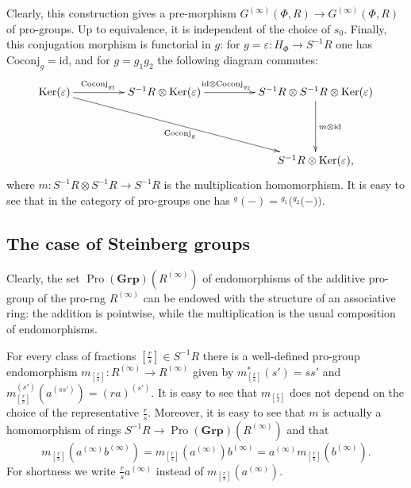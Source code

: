 \documentclass[oneside, 11pt]{amsart}
\numberwithin{equation}{section}
\theoremstyle{definition}
\theoremstyle{remark}
\DeclareMathOperator\Ker{Ker}
\DeclareMathOperator{\Pro}{Pro}
\newcommand{\Group}{\mathbf{Grp}}
\newcommand{\up}[2]{{^{#1}\!{#2}}}
\begin{document}
Clearly, this construction gives a pre-morphism \(G^{(\infty)}(\Phi, R) \to G^{(\infty)}(\Phi, R)\) of pro-groups. Up to equivalence, it is independent of the choice of \(s_0\). Finally, this conjugation morphism is functorial in \(g\): for \(g = \varepsilon \colon H_\Phi \to S^{-1} R\) one has \(\mathrm{Coconj}_g = \mathrm{id}\), and for \(g = g_1 g_2\) the following diagram commutes:
\[\xymatrix@+1.8pc{
\Ker(\varepsilon) \ar[r]^(.4){\mathrm{Coconj}_{g_{\scaleto{1}{2.5pt}}}} \ar[rrd]_{\mathrm{Coconj}_g} &
S^{-1} R \otimes \Ker(\varepsilon) \ar[r]^(0.41){\mathrm{id} \otimes \mathrm{Coconj}_{g_{\scaleto{2}{2.5pt}}}} &
S^{-1}R \otimes S^{-1} R \otimes \Ker(\varepsilon) \ar[d]^(0.5){m \otimes \mathrm{id}} \\
& & S^{-1} R \otimes \Ker(\varepsilon),
}\]
where \(m \colon S^{-1} R \otimes S^{-1} R \to S^{-1} R\) is the multiplication homomorphism. It is easy to see that in the category of pro-groups one has \(\up g{(-)} = \up{g_1}(\up{g_2}(-))\).

\subsection{The case of Steinberg groups}
Clearly, the set $\Pro(\Group)(R^{(\infty)})$ of endomorphisms of the additive pro-group of the pro-rng $R^{(\infty)}$ can be endowed with the structure of an associative ring: the addition is 
pointwise, 
while the multiplication is the usual composition of endomorphisms.

For every class of fractions \([\frac rs] \in S^{-1} R\) there is a well-defined pro-group endomorphism \(m_{[\frac rs]} \colon R^{(\infty)} \to R^{(\infty)}\) given by \(m_{[\frac rs]}^*(s') = ss'\) and \(m_{[\frac rs]}^{(s')}(a^{(ss')}) = (ra)^{(s')}\). It is easy to see that $m_{[\frac{r}{s}]}$ does not depend on the choice of the representative \(\tfrac r s\). Moreover, it is easy to see that \(m\) is actually a homomorphism of rings \(S^{-1} R \to \Pro(\Group)(R^{(\infty)})\) and that 
\begin{equation} \label{eq:m-mult} m_{[\frac rs]}(a^{(\infty)} b^{(\infty)}) = m_{[\frac rs]}(a^{(\infty)}) b^{(\infty)} = a^{(\infty)} m_{[\frac rs]}(b^{(\infty)}).\end{equation}
For shortness we write \(\frac rs a^{(\infty)}\) instead of \(m_{[\frac rs]}(a^{(\infty)})\). 
\end{document}
